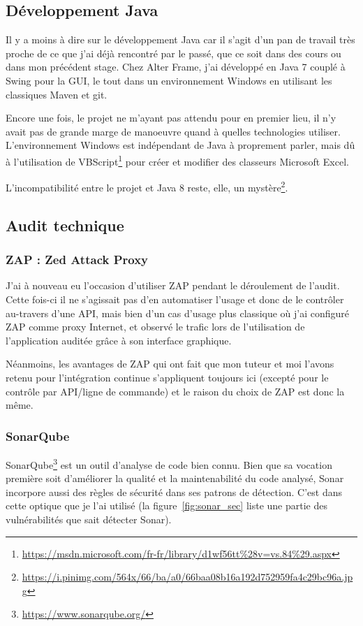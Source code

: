 \subsection{Développement Java}
Il y a moins à dire sur le développement Java car il s'agit d'un pan de travail très proche de ce que j'ai déjà rencontré par le passé, que ce soit dans des cours ou dans mon précédent stage. Chez Alter Frame, j'ai développé en Java 7 couplé à Swing pour la GUI, le tout dans un environnement Windows en utilisant les classiques Maven et git. 

Encore une fois, le projet ne m'ayant pas attendu pour en premier lieu, il n'y avait pas de grande marge de manoeuvre quand à quelles technologies utiliser. L'environnement Windows est indépendant de Java à proprement parler, mais dû à l'utilisation de VBScript\footnote{\url{https://msdn.microsoft.com/fr-fr/library/d1wf56tt\%28v=vs.84\%29.aspx}} pour créer et modifier des classeurs Microsoft Excel. 

L'incompatibilité entre le projet et Java 8 reste, elle, un mystère\footnote{\url{https://i.pinimg.com/564x/66/ba/a0/66baa08b16a192d752959fa4c29bc96a.jpg}}.

\subsection{Audit technique}
\subsubsection{ZAP : Zed Attack Proxy}
J'ai à nouveau eu l'occasion d'utiliser ZAP pendant le déroulement de l'audit. Cette fois-ci il ne s'agissait pas d'en automatiser l'usage et donc de le contrôler au-travers d'une API, mais bien d'un cas d'usage plus classique où j'ai configuré ZAP comme proxy Internet, et observé le trafic lors de l'utilisation de l'application auditée grâce à son interface graphique. 

Néanmoins, les avantages de ZAP qui ont fait que mon tuteur et moi l'avons retenu pour l'intégration continue s'appliquent toujours ici (excepté pour le contrôle par API/ligne de commande) et le raison du choix de ZAP est donc la même. 

\subsubsection{SonarQube}
SonarQube\footnote{\url{https://www.sonarqube.org/}} est un outil d'analyse de code bien connu. Bien que sa vocation première soit d'améliorer la qualité et la maintenabilité du code analysé, Sonar incorpore aussi des règles de sécurité dans ses patrons de détection. C'est dans cette optique que je l'ai utilisé (la figure~\ref{fig:sonar_sec} liste une partie des vulnérabilités que sait détecter Sonar). 

